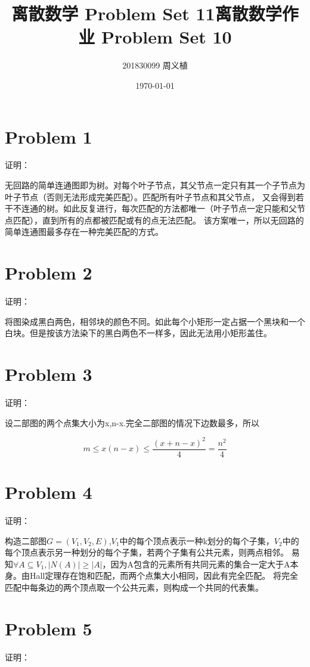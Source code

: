 \documentclass{article}
\title{离散数学 Problem Set 11}
\title{离散数学作业 Problem Set 10}
\author{201830099 周义植}
\date{\today}
\begin{document}
\maketitle
\section*{Problem 1}
证明：

无回路的简单连通图即为树。对每个叶子节点，其父节点一定只有其一个子节点为叶子节点（否则无法形成完美匹配）。匹配所有叶子节点和其父节点，
又会得到若干不连通的树。如此反复进行，每次匹配的方法都唯一（叶子节点一定只能和父节点匹配），直到所有的点都被匹配或有的点无法匹配。
该方案唯一，所以无回路的简单连通图最多存在一种完美匹配的方式。


\section*{Problem 2}
证明：

将图染成黑白两色，相邻块的颜色不同。如此每个小矩形一定占据一个黑块和一个白块。但是按该方法染下的黑白两色不一样多，因此无法用小矩形盖住。

\section*{Problem 3}

证明：

设二部图的两个点集大小为x,n-x.完全二部图的情况下边数最多，所以

\begin{equation}
    \nonumber
    m \leq x(n-x) \leq \frac{(x+n-x)^2}{4} = \frac{n^2}{4}
\end{equation}

\section*{Problem 4}
证明：

构造二部图$G = (V_1,V_2,E)$,$V_1$中的每个顶点表示一种k划分的每个子集，$V_2$中的每个顶点表示另一种划分的每个子集，若两个子集有公共元素，则两点相邻。
易知$\forall A\subseteq  V_1,|N(A)|\geq |A|$，因为A包含的元素所有共同元素的集合一定大于A本身。由Hall定理存在饱和匹配，而两个点集大小相同，因此有完全匹配。
将完全匹配中每条边的两个顶点取一个公共元素，则构成一个共同的代表集。
\section*{Problem 5}
证明：
\end{document}
